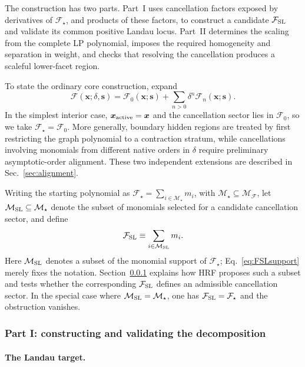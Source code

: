 \documentclass[a4paper,11pt]{article}
\newcommand{\x}{\boldsymbol{x}}
\newcommand{\s}{\boldsymbol{s}}
\newcommand{\FSL}{\mathcal F_{\rm SL}}
\newcommand{\MSL}{\mathcal M_{\rm SL}}
\begin{document}
The construction has two parts.  Part~I uses cancellation factors exposed by
derivatives of \(\mathcal F_\star\), and products of these factors, to
construct a candidate \(\FSL\) and validate its common positive Landau locus.
Part~II determines the scaling from the complete LP polynomial, imposes the
required homogeneity and separation in weight, and checks that resolving the
cancellation produces a scaleful lower-facet region.

To state the ordinary core construction, expand
\begin{equation}
 \mathcal F(\x;\delta,\s)
 =
 \mathcal F_0(\x;\s)
 +\sum_{n>0}\delta^n\mathcal F_n(\x;\s).
\label{eq:Fexpansion}
\end{equation}
In the simplest interior case, \(\x_{\rm active}=\x\) and the cancellation
sector lies in \(\mathcal F_0\), so we take
\(\mathcal F_\star=\mathcal F_0\).  More generally, boundary hidden regions
are treated by first restricting the graph polynomial to a contraction
stratum, while cancellations involving monomials from different native orders
in \(\delta\) require preliminary asymptotic-order alignment.  These two
independent extensions are described in Sec.~\ref{sec:alignment}.

Writing the starting polynomial as
\(\mathcal F_\star=\sum_{i\in\mathcal M_\star}m_i\), with
\(\mathcal M_\star\subseteq\mathcal M_{\mathcal F}\), let
\(\MSL\subseteq\mathcal M_\star\) denote the subset of monomials selected for
a candidate cancellation sector, and define
\begin{equation}
 \FSL\equiv\sum_{i\in\MSL}m_i.
\label{eq:FSLsupport}
\end{equation}
Here \(\MSL\) denotes a subset of the monomial support of
\(\mathcal F_\star\); Eq.~\eqref{eq:FSLsupport} merely fixes the notation.
Section~\ref{sec:decomposition} explains how HRF proposes such a subset and
tests whether the corresponding \(\FSL\) defines an admissible cancellation
sector.  In the special case where \(\MSL=\mathcal M_\star\), one has
\(\FSL=\mathcal F_\star\) and the obstruction vanishes.

\subsubsection{Part I: constructing and validating the decomposition}
\label{sec:decomposition}

\paragraph{The Landau target.}
\end{document}
